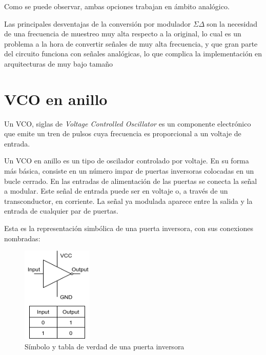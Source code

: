 \documentclass[12pt]{report} %
\newcommand{\sigmadelta}{$\Sigma\Delta\; $}
\begin{document}
	
	Como se puede observar, ambas opciones trabajan en ámbito analógico.
	
	Las principales desventajas de la conversión por modulador \sigmadelta son la necesidad de una frecuencia de muestreo muy alta respecto a la original, lo cual es un problema a la hora de convertir señales de muy alta frecuencia, y que gran parte del circuito funciona con señales analógicas, lo que complica la implementación en arquitecturas de muy bajo tamaño
	
	\section{VCO en anillo}
	
	Un VCO, siglas de \textit{Voltage Controlled Oscillator} es un componente electrónico que emite un tren de pulsos cuya frecuencia es proporcional a un voltaje de entrada.
	
	Un VCO en anillo es un tipo de oscilador controlado por voltaje. En su forma más básica, consiste en un número impar de puertas inversoras colocadas en un bucle cerrado. En las entradas de alimentación de las puertas se conecta la señal a modular. Este señal de entrada puede ser en voltaje o, a través de un transconductor, en corriente. La señal ya modulada aparece entre la salida y la entrada de cualquier par de puertas.
	
	Esta es la representación simbólica de una puerta inversora, con sus conexiones nombradas:
	\begin{figure}[H]
		\includegraphics[width=0.3\textwidth]{inverter-symbol.png}
		\caption[Símbolo y tabla de verdad de una puerta inversora]{Símbolo y tabla de verdad de una puerta inversora}
		\label{fig:inverter-symbol.png}
	\end{figure}
	
\end{document}
